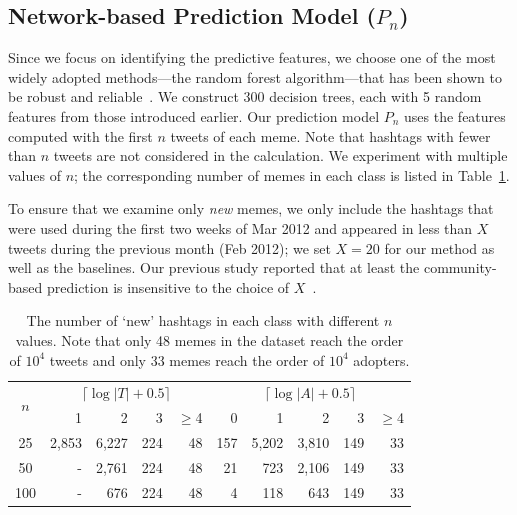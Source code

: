 \documentclass[letterpaper]{article}
\begin{document}
\subsection{Network-based Prediction Model ($P_n$)} 

Since we focus on identifying the predictive features, %
we choose one of the most widely adopted methods---the random forest algorithm---that has been shown to be robust and reliable~\cite{Breiman:2001fk}. We construct 300 decision trees, each with 5 random features from those introduced earlier.  
%
Our prediction model $P_n$ uses the features computed with the first $n$ tweets of each meme. Note that hashtags with fewer than $n$ tweets are not considered in the calculation. We experiment with multiple values of $n$; the corresponding number of memes in each class is listed in Table~\ref{table:class_stats}.


To ensure that we examine only \emph{new} memes, we only include the hashtags that were used during the first two weeks of Mar 2012 and appeared in less than $X$ tweets during the previous month (Feb 2012); we set $X=20$ for our method as well as the baselines. Our previous study reported that at least the community-based prediction is insensitive to the choice of $X$~\cite{weng2013viral}. 


\begin{table}
\caption{The number of `new' hashtags in each class with different $n$ values. Note that only 48 memes in the dataset reach the order of $10^4$ tweets and only 33 memes reach the order of $10^4$ adopters.}
\centering
\begin{tabular}{c | r  r  r  r  | r  r  r  r  r}
\hline
\multirow{2}{*}{$n$} & \multicolumn{4}{c|}{$\lceil \log |T| + 0.5 \rceil$} & \multicolumn{5}{c}{$\lceil \log |A| + 0.5 \rceil$} \\
 & 1 & 2 & 3 & $\geq$4 & 0 & 1 & 2 & 3 & $\geq$4 \\
 \hline\hline
25 & 2,853 & 6,227 & 224 & 48 & 157 & 5,202 & 3,810 & 149 & 33 \\
50 & - & 2,761 & 224 & 48 & 21 & 723 & 2,106 & 149 & 33\\
100 & - & 676 & 224 & 48 & 4 & 118 & 643 & 149 & 33\\
\hline
\end{tabular}
\label{table:class_stats}
\end{table}
\end{document}
